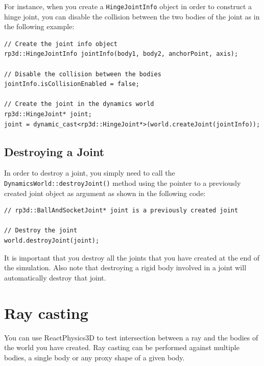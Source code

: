 \documentclass[a4paper,12pt]{article}
\begin{document}
    For instance, when you create a \texttt{HingeJointInfo} object in order to construct a hinge joint, you can disable the collision between the two bodies of the joint as in the
    following example: \\

    \begin{lstlisting}
// Create the joint info object
rp3d::HingeJointInfo jointInfo(body1, body2, anchorPoint, axis);

// Disable the collision between the bodies
jointInfo.isCollisionEnabled = false;

// Create the joint in the dynamics world
rp3d::HingeJoint* joint;
joint = dynamic_cast<rp3d::HingeJoint*>(world.createJoint(jointInfo));
  \end{lstlisting}

    \subsection{Destroying a Joint}

    \begin{sloppypar}
    In order to destroy a joint, you simply need to call the \texttt{DynamicsWorld::destroyJoint()} method using the pointer to
    a previously created joint object as argument as shown in the following code: \\
   \end{sloppypar}

    \begin{lstlisting}
// rp3d::BallAndSocketJoint* joint is a previously created joint

// Destroy the joint
world.destroyJoint(joint);
  \end{lstlisting}

    \vspace{0.6cm}

    It is important that you destroy all the joints that you have created at the end of the simulation. Also note that destroying a
    rigid body involved in a joint will automatically destroy that joint.

    \section{Ray casting}
    \label{sec:raycasting}

    You can use ReactPhysics3D to test intersection between a ray and the bodies of the world you have created. Ray casting can be performed against multiple bodies, a single body or
    any proxy shape of a given body. \\
\end{document}
